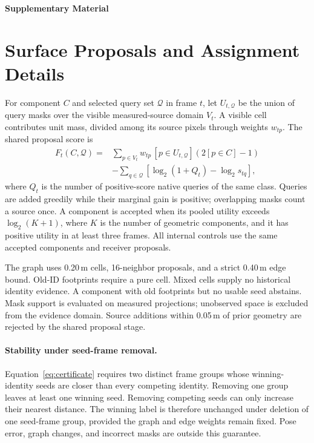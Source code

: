 \clearpage\nobalance\onecolumn
\appendix
\begin{center}\Large\bfseries Supplementary Material\end{center}

\section{Surface Proposals and Assignment Details}\label{app:proposals}
For component $C$ and selected query set $\mathcal Q$ in frame $t$, let $U_{t,\mathcal Q}$ be the union of query masks over the visible measured-source domain $V_t$. A visible cell contributes unit mass, divided among its source pixels through weights $w_{tp}$. The shared proposal score is
\begin{align}
F_t(C,\mathcal Q)={}&\sum_{p\in V_t}w_{tp}\,[p\in U_{t,\mathcal Q}]
             (2[p\in C]-1) \nonumber\\
 &-\sum_{q\in\mathcal Q}\left[\log_2(1+Q_t)-\log_2 s_{tq}\right],
\end{align}
where $Q_t$ is the number of positive-score native queries of the same class. Queries are added greedily while their marginal gain is positive; overlapping masks count a source once. A component is accepted when its pooled utility exceeds $\log_2(K+1)$, where $K$ is the number of geometric components, and it has positive utility in at least three frames. All internal controls use the same accepted components and receiver proposals.

The graph uses 0.20\,m cells, 16-neighbor proposals, and a strict 0.40\,m edge bound. Old-ID footprints require a pure cell. Mixed cells supply no historical identity evidence. A component with old footprints but no usable seed abstains. Mask support is evaluated on measured projections; unobserved space is excluded from the evidence domain. Source additions within 0.05\,m of prior geometry are rejected by the shared proposal stage.

\paragraph{Stability under seed-frame removal.}
Equation~\ref{eq:certificate} requires two distinct frame groups whose winning-identity seeds are closer than every competing identity. Removing one group leaves at least one winning seed. Removing competing seeds can only increase their nearest distance. The winning label is therefore unchanged under deletion of one seed-frame group, provided the graph and edge weights remain fixed. Pose error, graph changes, and incorrect masks are outside this guarantee.

